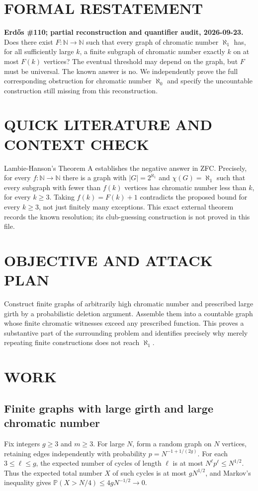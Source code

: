 \section{FORMAL RESTATEMENT}
\textbf{Erd\H{o}s \#110; partial reconstruction and quantifier audit, 2026-09-23.}
Does there exist $F:\mathbb N\to\mathbb N$ such that every graph of chromatic number $\aleph_1$ has, for all sufficiently large $k$, a finite subgraph of chromatic number exactly $k$ on at most $F(k)$ vertices? The eventual threshold may depend on the graph, but $F$ must be universal. The known answer is no. We independently prove the full corresponding obstruction for chromatic number $\aleph_0$ and specify the uncountable construction still missing from this reconstruction.

\section{QUICK LITERATURE AND CONTEXT CHECK}
Lambie-Hanson's Theorem A establishes the negative answer in ZFC. Precisely, for every $f:\mathbb N\to\mathbb N$ there is a graph with $|G|=2^{\aleph_1}$ and $\chi(G)=\aleph_1$ such that every subgraph with fewer than $f(k)$ vertices has chromatic number less than $k$, for every $k\geq3$. Taking $f(k)=F(k)+1$ contradicts the proposed bound for every $k\geq3$, not just finitely many exceptions. This exact external theorem records the known resolution; its club-guessing construction is not proved in this file.

\section{OBJECTIVE AND ATTACK PLAN}
Construct finite graphs of arbitrarily high chromatic number and prescribed large girth by a probabilistic deletion argument. Assemble them into a countable graph whose finite chromatic witnesses exceed any prescribed function. This proves a substantive part of the surrounding problem and identifies precisely why merely repeating finite constructions does not reach $\aleph_1$.

\section{WORK}
\subsection{Finite graphs with large girth and large chromatic number}
Fix integers $g\geq3$ and $m\geq3$. For large $N$, form a random graph on $N$ vertices, retaining edges independently with probability $p=N^{-1+1/(2g)}$. For each $3\leq\ell\leq g$, the expected number of cycles of length $\ell$ is at most $N^\ell p^\ell\leq N^{1/2}$. Thus the expected total number $X$ of such cycles is at most $gN^{1/2}$, and Markov's inequality gives $\mathbb P(X>N/4)\leq4gN^{-1/2}\to0$.

